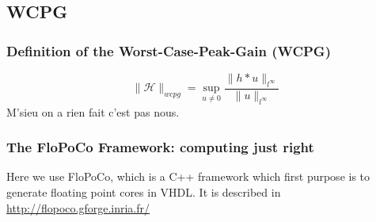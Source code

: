 \subsection{WCPG}
\begin{frame}
	\frametitle{Definition of the Worst-Case-Peak-Gain (WCPG)}
	\begin{equation}
		\|\mathcal{H}\|_{wcpg}=\sup_{u\neq0}\frac{\|h*u\|_{l^{\infty}}}{\|u\|_{l^{\infty}}}
	\end{equation}
	M'sieu on a rien fait c'est pas nous.
\end{frame}


\subsubsection{The FloPoCo Framework: computing just right}
	\begin{frame}
		Here we use FloPoCo, which is a C++ framework which first purpose is to generate floating point cores in VHDL.
		It is described in 
		\url{http://flopoco.gforge.inria.fr/}
	\end{frame}

